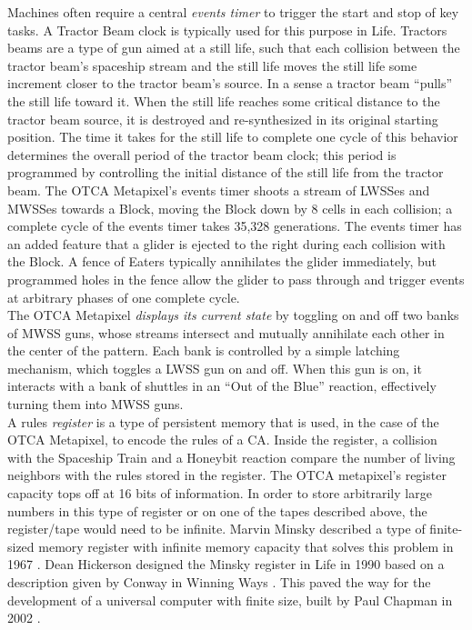 {Machines often require a central \textit{events timer} to trigger the start and stop of key tasks.  A Tractor Beam clock is typically used for this purpose in Life.  Tractors beams are a type of gun aimed at a still life, such that each collision between the tractor beam's spaceship stream and the still life moves the still life some increment closer to the tractor beam's source.  In a sense a tractor beam ``pulls'' the still life toward it.  When the still life reaches some critical distance to the tractor beam source, it is destroyed and re-synthesized in its original starting position.  The time it takes for the still life to complete one cycle of this behavior determines the overall period of the tractor beam clock; this period is programmed by controlling the initial distance of the still life from the tractor beam.  The OTCA Metapixel's events timer shoots a stream of LWSSes and MWSSes towards a Block, moving the Block down by 8 cells in each collision; a complete cycle of the events timer takes 35,328 generations.  The events timer has an added feature that a glider is ejected to the right during each collision with the Block.  A fence of Eaters typically annihilates the glider immediately, but programmed holes in the fence allow the glider to pass through and trigger events at arbitrary phases of one complete cycle.\\

The OTCA Metapixel \textit{displays its current state} by toggling on and off two banks of MWSS guns, whose streams intersect and mutually annihilate each other in the center of the pattern.  Each bank is controlled by a simple latching mechanism, which toggles a LWSS gun on and off.  When this gun is on, it interacts with a bank of shuttles in an ``Out of the Blue'' reaction, effectively turning them into MWSS guns.\\

A rules \textit{register} is a type of persistent memory that is used, in the case of the OTCA Metapixel, to encode the rules of a CA.  Inside the register, a collision with the Spaceship Train and a Honeybit reaction compare the number of living neighbors with the rules stored in the register.  The OTCA metapixel's register capacity tops off at 16 bits of information.  In order to store arbitrarily large numbers in this type of register or on one of the tapes described above, the register/tape would need to be infinite.  Marvin Minsky described a type of finite-sized memory register with infinite memory capacity that solves this problem in 1967 \cite{Minsky1967}.  Dean Hickerson designed the Minsky register in Life \cite{Hickerson1900} in 1990 based on a description given by Conway in Winning Ways \cite{Berekamp1982}.  This paved the way for the development of a universal computer with finite size, built by Paul Chapman in 2002 \cite{Chapman2002}.\\

}
